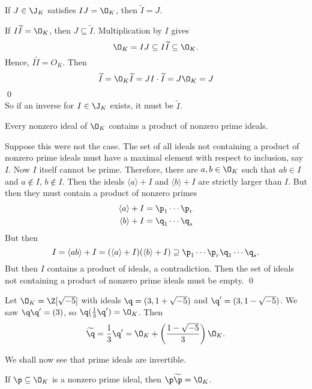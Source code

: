 \begin{lem}\label{lem:invunique}
If $J \in \J_K$ satisfies $IJ=\O_K$, then $\widetilde{I}=J$.
\end{lem}

\pf If $I \widetilde{I}=\O_K$, then $J \subseteq \widetilde{I}$. Multiplication by $I$ gives
	\[
	\O_K= IJ \subseteq I\widetilde{I} \subseteq \O_K.
	\]
Hence, $I\widetilde{I}=O_K$. Then
	\[
	\widetilde{I}=\O_K\widetilde{I}= JI \cdot \widetilde{I}= J\O_K=J
	\]
\qed \\

So if an inverse for $I \in \J_K$ exists, it must be $\widetilde{I}$. 

\begin{lem}\label{lem:product}
Every nonzero ideal of $\O_K$ contains a product of nonzero prime ideals.
\end{lem}

\pf Suppose this were not the case. The set of all ideals not containing a product of nonzero prime ideals must have a maximal element with respect to inclusion, say $I$. Now $I$ itself cannot be prime. Therefore, there are $a,b \in \O_K$ such that $ab \in I$ and $a \notin I$, $b \notin I$. Then the ideals $\langle a \rangle + I$ and $\langle b \rangle + I$ are strictly larger than $I$. But then they must contain a product of nonzero primes
	\[
	\begin{split}
	\langle a \rangle + I &= \p_1\cdots \p_r \\
	\langle b \rangle + I &= \q_1 \cdots \q_s 
	\end{split}
	\]
But then
	\[
	I= \langle ab \rangle + I = (\langle a \rangle + I)(\langle b \rangle + I) \supseteq \p_1\cdots \p_r \q_1 \cdots \q_s.
	\]
But then $I$ contains a product of ideals, a contradiction. Then the set of ideals not containing a product of nonzero prime ideals must be empty. \qed \\

\begin{ex}
Let $\O_K=\Z[\sqrt{-5}]$ with ideals $\q=(3,1+\sqrt{-5})$ and $\q'=(3,1-\sqrt{-5})$. We saw $\q\q'=(3)$, so $\q(\frac{1}{3}\q')=\O_K$. Then
	\[
	\widetilde{\q}= \frac{1}{3} \q' = \O_K + \left(\dfrac{1-\sqrt{-5}}{3}\right) \O_K.
	\] \xqed
\end{ex}

We shall now see that prime ideals are invertible. 

\begin{prop}
If $\p \subseteq \O_K$ is a nonzero prime ideal, then $\p \widetilde{\p}=\O_K$.
\end{prop}

